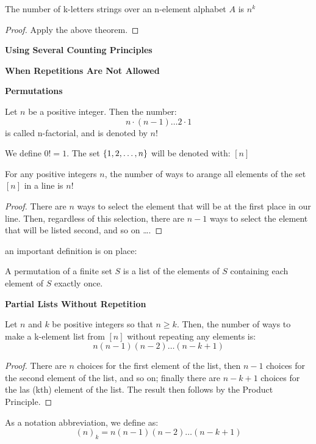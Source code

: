 \begin{cor}
	The number of k-letters strings over an n-element alphabet $A$ is $n^k$
\end{cor}
\begin{proof}
	Apply the above theorem.
\end{proof}

\textbf{Using Several Counting Principles}

\textbf{When Repetitions Are Not Allowed}

\textbf{Permutations}

\begin{define}
	Let $n$ be a positive integer. Then the number:
	\[ n \cdot (n-1) \ldots 2 \cdot 1 \]
	is called n-factorial, and is denoted by $n!$
\end{define}
We define $0! = 1$.
The set $ \left\lbrace 1,2, \ldots, n \right\rbrace $ will be denoted with: $ [n] $ 
\begin{thm}
	For any positive integers $n$, the number of ways to arange all elements of the set $ [n] $ in a line is $n!$
\end{thm}
\begin{proof}
	There are $n$ ways to select the element that will be at the first place in our line. Then, regardless of this selection, there are $n-1$ ways to select the element that will be listed second, and so on \ldots.
\end{proof}
an important definition is on place:

\begin{define}
	A permutation of a finite set $S$ is a list of the elements of $S$ containing each element of $S$ exactly once.
\end{define}

\textbf{Partial Lists Without Repetition}

\begin{thm}
	Let $n$ and $k$ be positive integers so that $ n \geq k$. Then, the number of ways to make a k-element list from $[n]$ without repeating any elements is:
	\[ n(n-1)(n-2) \ldots (n-k+1) \]
\end{thm}
\begin{proof}
	There are $n$ choices for the first element of the list, then $n-1$ choices for the second element of the list, and so on; finally there are $n-k+1$ choices for the las (kth) element of the list. The result then follows by the Product Principle.
\end{proof}
As a notation abbreviation, we define as:
\[ (n)_k = n(n-1)(n-2)\ldots(n-k+1) \]



